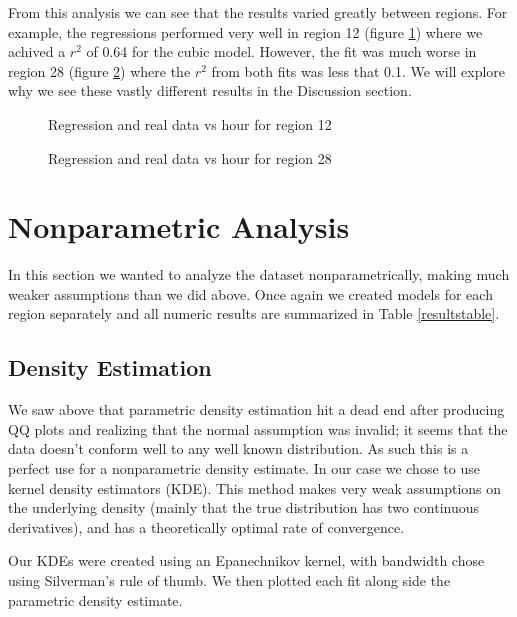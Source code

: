 \documentclass[12pt]{article}
\begin{document}
From this analysis we can see that the results varied greatly between regions. For example, the regressions performed very well in region 12 (figure \ref{region12parametricregression}) where we achived a $r^2$ of 0.64 for the cubic model. However, the fit was much worse in region 28  (figure \ref{region28parametricregression}) where the $r^2$ from both fits was less that 0.1. We will explore why we see these vastly different results in the Discussion section.
\begin{figure}[!ht]
\centering
{} 
\caption{Regression and real data vs hour for region 12}
\label{region12parametricregression}
\end{figure}
\begin{figure}[!ht]
\centering
{} 
\caption{Regression and real data vs hour for region 28}
\label{region28parametricregression}
\end{figure}
\section{Nonparametric Analysis}
In this section we wanted to analyze the dataset nonparametrically, making much weaker assumptions than we did above. Once again we created models for each region separately and all numeric results are summarized in Table \ref{resultstable}.
\subsection{Density Estimation}
We saw above that parametric density estimation hit a dead end after producing QQ plots and realizing that the normal assumption was invalid; it seems that the data doesn't conform well to any well known distribution. As such this is a perfect use for a nonparametric density estimate. In our case we chose to use kernel density estimators (KDE). This method makes very weak assumptions on the underlying density (mainly that the true distribution has two continuous derivatives), and has a theoretically optimal rate of convergence. 

Our KDEs were created using an Epanechnikov kernel, with bandwidth chose using Silverman's rule of thumb. We then plotted each fit along side the parametric density estimate. 
\end{document}
